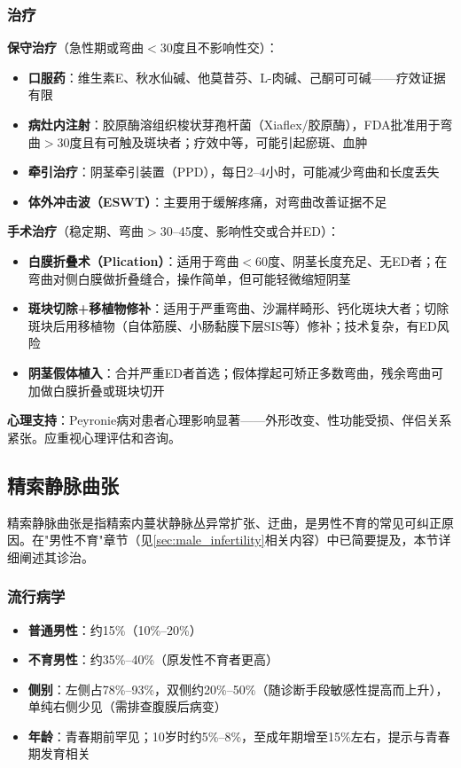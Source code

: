 \subsubsection{治疗}

\textbf{保守治疗}（急性期或弯曲$<$30度且不影响性交）：
\begin{itemize}[leftmargin=2cm]
	\item \textbf{口服药}：维生素E、秋水仙碱、他莫昔芬、L-肉碱、己酮可可碱——疗效证据有限
	\item \textbf{病灶内注射}：胶原酶溶组织梭状芽孢杆菌（Xiaflex/胶原酶），FDA批准用于弯曲$>$30度且有可触及斑块者；疗效中等，可能引起瘀斑、血肿
	\item \textbf{牵引治疗}：阴茎牵引装置（PPD），每日2--4小时，可能减少弯曲和长度丢失
	\item \textbf{体外冲击波（ESWT）}：主要用于缓解疼痛，对弯曲改善证据不足
\end{itemize}

\textbf{手术治疗}（稳定期、弯曲$>$30--45度、影响性交或合并ED）：
\begin{itemize}[leftmargin=2cm]
	\item \textbf{白膜折叠术（Plication）}：适用于弯曲$<$60度、阴茎长度充足、无ED者；在弯曲对侧白膜做折叠缝合，操作简单，但可能轻微缩短阴茎
	\item \textbf{斑块切除+移植物修补}：适用于严重弯曲、沙漏样畸形、钙化斑块大者；切除斑块后用移植物（自体筋膜、小肠黏膜下层SIS等）修补；技术复杂，有ED风险
	\item \textbf{阴茎假体植入}：合并严重ED者首选；假体撑起可矫正多数弯曲，残余弯曲可加做白膜折叠或斑块切开
\end{itemize}

\textbf{心理支持}：Peyronie病对患者心理影响显著——外形改变、性功能受损、伴侣关系紧张。应重视心理评估和咨询。

\subsection{精索静脉曲张}
\label{subsec:varicocele}

精索静脉曲张是指精索内蔓状静脉丛异常扩张、迂曲，是男性不育的常见可纠正原因。在"男性不育"章节（见\ref{sec:male_infertility}相关内容）中已简要提及，本节详细阐述其诊治。

\subsubsection{流行病学}

\begin{itemize}[leftmargin=2cm]
	\item \textbf{普通男性}：约15\%（10\%--20\%）
	\item \textbf{不育男性}：约35\%--40\%（原发性不育者更高）
	\item \textbf{侧别}：左侧占78\%--93\%，双侧约20\%--50\%（随诊断手段敏感性提高而上升），单纯右侧少见（需排查腹膜后病变）
	\item \textbf{年龄}：青春期前罕见；10岁时约5\%--8\%，至成年期增至15\%左右，提示与青春期发育相关
\end{itemize}

